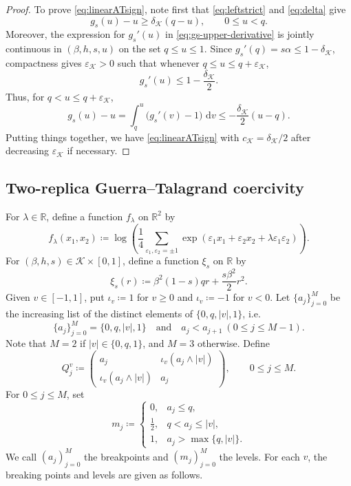 \documentclass[11pt]{article}
\numberwithin{equation}{section}
\newcommand{\1}{\mathbf 1}
\newcommand{\cK}{\mathcal K}
\newcommand{\dd}{\,\mathrm d}
\begin{document}
\begin{proof}
To prove \eqref{eq:linearATsign}, note first that \eqref{eq:leftstrict} and
\eqref{eq:delta} give
\[
 g_s(u)-u\ge\delta_{\cK}(q-u),
 \qquad 0\le u<q.
\]
Moreover, the expression for $g_s'(u)$ in \eqref{eq:gs-upper-derivative}
is jointly continuous in $(\beta,h,s,u)$ on the set $q\le u\le1$.
Since $g_s'(q)=s\alpha\le1-\delta_{\cK}$, compactness gives
$\varepsilon_{\cK}>0$ such that $\text{whenever }q\le u\le q+\varepsilon_{\cK}$,
\[
 g_s'(u)\le1-\frac{\delta_{\cK}}2.
\]
Thus, for $q<u\le q+\varepsilon_{\cK}$,
\[
 g_s(u)-u
 =\int_q^u\bigl(g_s'(v)-1\bigr)\,\dd v
 \le-\frac{\delta_{\cK}}2(u-q).
\]
Putting things together, we have 
\eqref{eq:linearATsign} with $c_{\cK}=\delta_{\cK}/2$ after decreasing
$\varepsilon_{\cK}$ if necessary.
\end{proof}

\subsection{Two-replica Guerra--Talagrand coercivity}\label{subsec:GT}

For $\lambda\in\mathbb R$, define a function $f_\lambda$ on ${\mathbb R}^2$ by
\begin{equation}
 f_\lambda(x_1,x_2)
 \coloneqq\log\left(\frac14\sum_{\varepsilon_1,\varepsilon_2=\pm1}
 \exp(\varepsilon_1x_1+\varepsilon_2x_2
       +\lambda\varepsilon_1\varepsilon_2)\right).
 \label{eq:GTterminal}
\end{equation}
For $(\beta,h,s)\in\cK\times[0,1]$, define a function $\xi_s$ on ${\mathbb R}$ by
\begin{equation}
 \xi_s(r)\coloneqq\beta^2(1-s)qr+\frac{s\beta^2}{2}r^2.
\label{eq:xi}
\end{equation}
Given $v\in[-1,1]$, put $\iota_v\coloneqq1$ for $v\ge0$ and
$\iota_v\coloneqq-1$ for $v<0$.  Let $\{ a_j \}_{j=0}^{M}$ be the increasing list of the distinct elements of $\{0,q,|v|,1\}$, i.e.
\[
\{ a_j \}_{j=0}^{M}= \{0,q,|v|,1\} \quad \mbox{and} \quad a_j< a_{j+1} \ (0\le j \le M-1).
\]
Note that $M=2$ if $|v| \in \{0,q,1\}$, and $M=3$ otherwise.
Define
\begin{equation}
 Q_j^v\coloneqq
 \begin{pmatrix}
 a_j&\iota_v(a_j\wedge |v|)\\
 \iota_v(a_j\wedge |v|)&a_j
 \end{pmatrix},
 \qquad 0\le j\le M.
\end{equation}
For $0\le j\le M$, set
\begin{equation}
 m_j\coloneqq
 \begin{cases}
 0,&a_j\le q,\\[1mm]
 \frac12,&q<a_j\le |v|,\\[1mm]
 1,&a_j>\max\{q,|v|\}.
 \end{cases}
\end{equation}
We call $(a_j)_{j=0}^M$ the breakpoints and $(m_j)_{j=0}^{M}$ the levels.
For each $v$, the breaking points and levels are given as follows.
\end{document}
